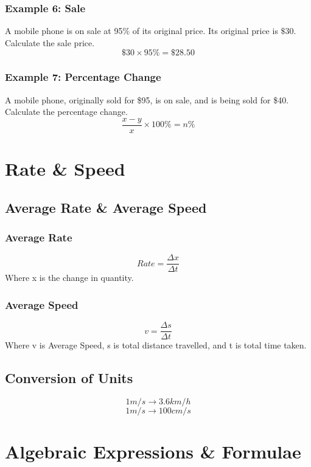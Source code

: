 \documentclass{report}
\begin{document}
\begin{flushleft}
\subsubsection{Example 6: Sale}
A mobile phone is on sale at 95\% of its original price. Its original price is $\$30$. Calculate the sale price.
\[\$30\times95\%=\$28.50\]

\subsubsection{Example 7: Percentage Change}
A mobile phone, originally sold for \$95, is on sale, and is being sold for \$40. Calculate the percentage change.
\begin{equation}
    \frac{x-y}{x}\times100\%=n\%
\end{equation}

\section{Rate \& Speed}
\subsection{Average Rate \& Average Speed}
\subsubsection*{Average Rate}
\begin{equation}
    Rate=\frac{\Delta x}{\Delta t}
\end{equation}
Where x is the change in quantity.

\subsubsection{Average Speed}
\begin{equation}
    v = \frac{\Delta s}{\Delta t}
\end{equation}
Where v is Average Speed, s is total distance travelled, and t is total time taken.

\subsection{Conversion of Units}
\[
1 m/s\rightarrow 3.6 km/h
\]
\[
1 m/s\rightarrow 100 cm/s
\]

\section{Algebraic Expressions \& Formulae}


\end{flushleft}
\end{document}
